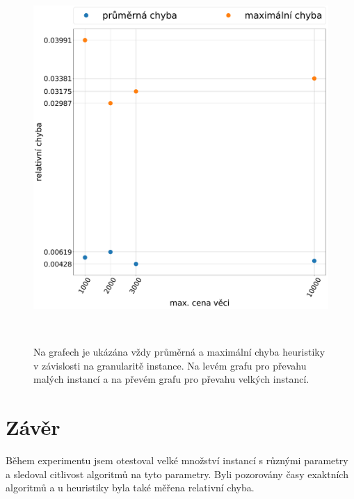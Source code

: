 \documentclass[11pt]{article}
\begin{document}
\begin{figure}
\begin{minipage}[c]{0.49\textwidth}
        \centering \includegraphics[width=\textwidth]{img/CHE.pdf} 
    \end{minipage}
    \\
   \caption{Na grafech je ukázána vždy průměrná a maximální chyba heuristiky v závislosti na granularitě instance. Na levém grafu pro převahu malých instancí a na převém grafu pro převahu velkých instancí.}\label{fig:GOEI}
    \end{figure} 
    
   




\section{Závěr}
Během experimentu jsem otestoval velké množství instancí s různými parametry a sledoval citlivost algoritmů na tyto parametry. Byli pozorovány časy exaktních algoritmů a u heuristiky byla také měřena relativní chyba. 
\end{document}
